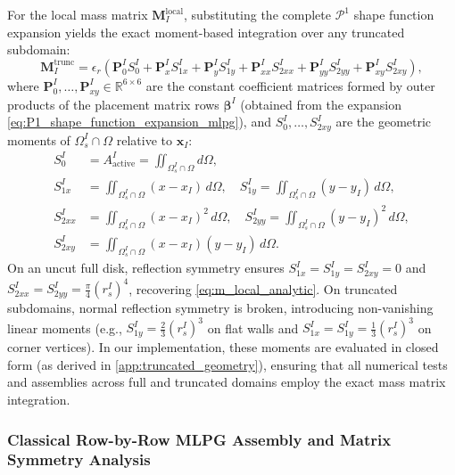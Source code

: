\documentclass[preprint,12pt]{elsarticle}
\begin{document}
For the local mass matrix $\mathbf{M}_I^{\mathrm{local}}$, substituting the complete $\mathcal{P}^1$ shape function expansion yields the exact moment-based integration over any truncated subdomain:
\begin{equation}
    \mathbf{M}_I^{\mathrm{trunc}} = \epsilon_r \left( \mathbf{P}_0^I S_0^I + \mathbf{P}_x^I S_{1x}^I + \mathbf{P}_y^I S_{1y}^I + \mathbf{P}_{xx}^I S_{2xx}^I + \mathbf{P}_{yy}^I S_{2yy}^I + \mathbf{P}_{xy}^I S_{2xy}^I \right),
    \label{eq:m_truncated_moments}
\end{equation}
where $\mathbf{P}_0^I, \dots, \mathbf{P}_{xy}^I \in \mathbb{R}^{6 \times 6}$ are the constant coefficient matrices formed by outer products of the placement matrix rows $\boldsymbol{\beta}^I$ (obtained from the expansion \eqref{eq:P1_shape_function_expansion_mlpg}), and $S_0^I, \dots, S_{2xy}^I$ are the geometric moments of $\Omega_s^I \cap \Omega$ relative to $\mathbf{x}_I$:
\begin{align}
    S_0^I     & = A_{\mathrm{active}}^I = \iint_{\Omega_s^I \cap \Omega} d\Omega,                                                                 \\
    S_{1x}^I  & = \iint_{\Omega_s^I \cap \Omega} (x - x_I) \, d\Omega, \quad S_{1y}^I = \iint_{\Omega_s^I \cap \Omega} (y - y_I) \, d\Omega,      \\
    S_{2xx}^I & = \iint_{\Omega_s^I \cap \Omega} (x - x_I)^2 \, d\Omega, \quad S_{2yy}^I = \iint_{\Omega_s^I \cap \Omega} (y - y_I)^2 \, d\Omega, \\
    S_{2xy}^I & = \iint_{\Omega_s^I \cap \Omega} (x - x_I)(y - y_I) \, d\Omega.
\end{align}
On an uncut full disk, reflection symmetry ensures $S_{1x}^I = S_{1y}^I = S_{2xy}^I = 0$ and $S_{2xx}^I = S_{2yy}^I = \frac{\pi}{4}(r_s^I)^4$, recovering \eqref{eq:m_local_analytic}. On truncated subdomains, normal reflection symmetry is broken, introducing non-vanishing linear moments (e.g., $S_{1y}^I = \frac{2}{3}(r_s^I)^3$ on flat walls and $S_{1x}^I = S_{1y}^I = \frac{1}{3}(r_s^I)^3$ on corner vertices). In our implementation, these moments are evaluated in closed form (as derived in \ref{app:truncated_geometry}), ensuring that all numerical tests and assemblies across full and truncated domains employ the exact mass matrix integration.

\subsubsection{Classical Row-by-Row MLPG Assembly and Matrix Symmetry Analysis}
\label{subsubsec:row_mlpg_symmetry}
\end{document}
